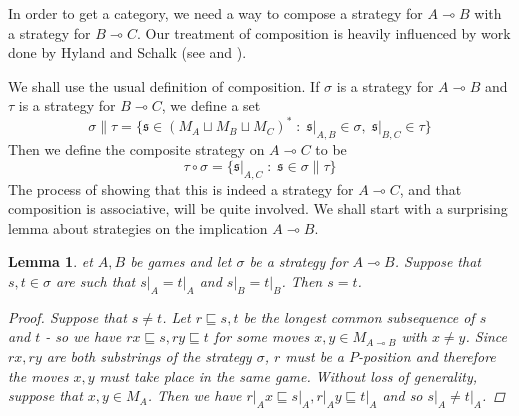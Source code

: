 \documentclass[11pt]{article} %
\theoremstyle{plain} %
\newtheorem{lemma}[theorem]{Lemma}
\theoremstyle{definition} %
\theoremstyle{exercisestyle}
\renewcommand{\implies}{\multimap}
\newcommand{\comp}[2]{#1 \circ #2}
\newcommand{\cprd}{\sqcup}
\newcommand{\suchthat}{\;\colon\;}
\newcommand{\s}{\mathfrak s}
\newcommand{\prefix}{\sqsubseteq}
\begin{document}
In order to get a category, we need a way to compose a strategy for $A\implies B$ with a strategy for $B\implies C$.  Our treatment of composition is heavily influenced by work done by Hyland and Schalk (see \cite{hyland1997games} and \cite{hylandschalkgames}).  

We shall use the usual definition of composition.  If $\sigma$ is a strategy for $A\implies B$ and $\tau$ is a strategy for $B\implies C$, we define a set
\[
  \sigma\|\tau = \{\s\in (M_A \cprd M_B \cprd M_C)^*\suchthat \s\vert_{A,B}\in\sigma,\;\s\vert_{B,C}\in\tau\}
  \]
Then we define the composite strategy on $A\implies C$ to be
\[
  \comp\tau\sigma = \{\s\vert_{A,C}\suchthat\s\in\sigma\|\tau\}
  \]
The process of showing that this is indeed a strategy for $A\implies C$, and that composition is associative, will be quite involved.  We shall start with a surprising lemma about strategies on the implication $A\implies B$.  

\begin{lemma}
  \label{PlayInStrategyDeterminedByComponents}
  et $A,B$ be games and let $\sigma$ be a strategy for $A\implies B$.  Suppose that $s,t\in\sigma$ are such that $s\vert_A=t\vert_A$ and $s\vert_B=t\vert_B$.  Then $s=t$.
  \begin{proof}
    Suppose that $s\ne t$.  Let $r\prefix s,t$ be the longest common subsequence of $s$ and $t$ - so we have $rx\prefix s, ry\prefix t$ for some moves $x,y\in M_{A\implies B}$ with $x\ne y$.  Since $rx,ry$ are both substrings of the strategy $\sigma$, $r$ must be a $P$-position and therefore the moves $x,y$ must take place in the same game.  Without loss of generality, suppose that $x,y\in M_A$.  Then we have $r\vert_Ax\prefix s\vert_A,r\vert_Ay\prefix t\vert_A$ and so $s\vert_A\ne t\vert_A$.
  \end{proof}
\end{lemma}
\end{document}
